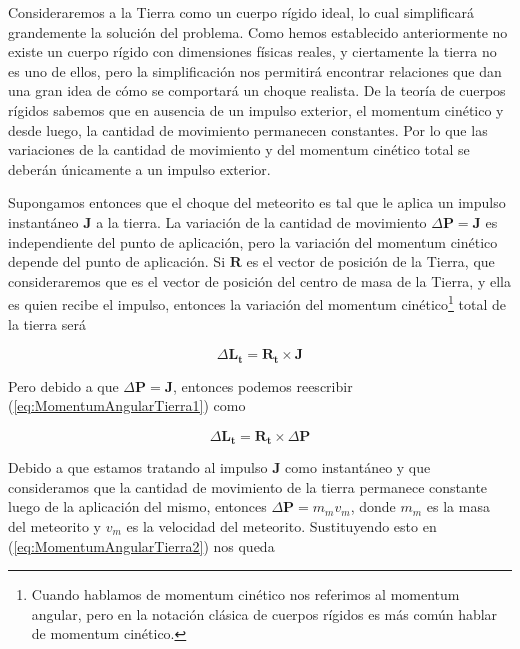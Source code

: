 \documentclass[a4paper,10pt]{article}
\begin{document}
Consideraremos a la Tierra como un cuerpo rígido ideal, lo cual simplificará grandemente
la solución del problema. Como hemos establecido anteriormente no existe un cuerpo rígido
con dimensiones físicas reales, y ciertamente la tierra no es uno de ellos, pero la simplificación
nos permitirá encontrar relaciones que dan una gran idea de cómo se comportará un choque
realista. De la teoría de cuerpos rígidos sabemos que en ausencia de un impulso exterior,
el momentum cinético y desde luego, la cantidad de movimiento permanecen constantes. Por 
lo que las variaciones de la cantidad de movimiento y del momentum cinético total se
deberán únicamente a un impulso exterior.

\vspace{.3cm}

Supongamos entonces que el choque del meteorito es tal que le aplica un impulso instantáneo
$\mathbf{J}$ a la tierra. La variación de la cantidad de movimiento $\Delta \mathbf{P} = \mathbf{J}$
es independiente del punto de aplicación, pero la variación del momentum cinético depende
del punto de aplicación. Si $\mathbf{R}$ es el vector de posición de la Tierra, que consideraremos
que es el vector de posición del centro de masa de la Tierra, y ella es quien recibe 
el impulso, entonces la variación del momentum cinético\footnote{Cuando hablamos de momentum cinético nos referimos al momentum angular, pero en la
notación clásica de cuerpos rígidos es más común hablar de momentum cinético.} total
de la tierra será

\begin{equation}
 \Delta \mathbf{L_t} = \mathbf{R_t} \times \mathbf{J}
 \label{eq:MomentumAngularTierra1}
\end{equation}

Pero debido a que $\Delta \mathbf{P} = \mathbf{J}$, entonces podemos reescribir 
(\ref{eq:MomentumAngularTierra1}) como

\begin{equation}
 \Delta \mathbf{L_t} = \mathbf{R_t} \times \Delta \mathbf{P}
 \label{eq:MomentumAngularTierra2} 
\end{equation}

Debido a que estamos tratando al impulso $\mathbf{J}$ como instantáneo y que consideramos
que la cantidad de movimiento de la tierra permanece constante luego de la aplicación
del mismo, entonces $\Delta \mathbf{P} = m_m v_m$, donde $m_m$ es la masa del meteorito
y $v_m$ es la velocidad del meteorito. Sustituyendo esto en (\ref{eq:MomentumAngularTierra2})
nos queda
\end{document}
